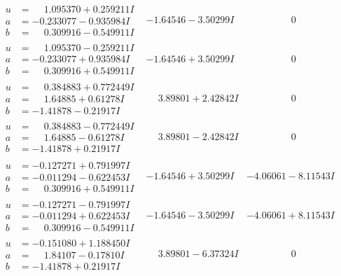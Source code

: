 \documentclass[1p]{elsarticle_modified}
\theoremstyle{definition}
\begin{document}
$$\begin{array}{c|c|c}
\begin{aligned}
u &= \phantom{-}1.095370 + 0.259211 I \\
a &= -0.233077 - 0.935984 I \\
b &= \phantom{-}0.309916 - 0.549911 I\end{aligned}
 & -1.64546 - 3.50299 I & \phantom{-0.000000 } 0 \\ \hline\begin{aligned}
u &= \phantom{-}1.095370 - 0.259211 I \\
a &= -0.233077 + 0.935984 I \\
b &= \phantom{-}0.309916 + 0.549911 I\end{aligned}
 & -1.64546 + 3.50299 I & \phantom{-0.000000 } 0 \\ \hline\begin{aligned}
u &= \phantom{-}0.384883 + 0.772449 I \\
a &= \phantom{-}1.64885 + 0.61278 I \\
b &= -1.41878 - 0.21917 I\end{aligned}
 & \phantom{-}3.89801 + 2.42842 I & \phantom{-0.000000 } 0 \\ \hline\begin{aligned}
u &= \phantom{-}0.384883 - 0.772449 I \\
a &= \phantom{-}1.64885 - 0.61278 I \\
b &= -1.41878 + 0.21917 I\end{aligned}
 & \phantom{-}3.89801 - 2.42842 I & \phantom{-0.000000 } 0 \\ \hline\begin{aligned}
u &= -0.127271 + 0.791997 I \\
a &= -0.011294 - 0.622453 I \\
b &= \phantom{-}0.309916 + 0.549911 I\end{aligned}
 & -1.64546 + 3.50299 I & -4.06061 - 8.11543 I \\ \hline\begin{aligned}
u &= -0.127271 - 0.791997 I \\
a &= -0.011294 + 0.622453 I \\
b &= \phantom{-}0.309916 - 0.549911 I\end{aligned}
 & -1.64546 - 3.50299 I & -4.06061 + 8.11543 I \\ \hline\begin{aligned}
u &= -0.151080 + 1.188450 I \\
a &= \phantom{-}1.84107 - 0.17810 I \\
b &= -1.41878 + 0.21917 I\end{aligned}
 & \phantom{-}3.89801 - 6.37324 I & \phantom{-0.000000 } 0 \\ \hline\begin{aligned}

\end{aligned}
\end{array}$$
\end{document}
